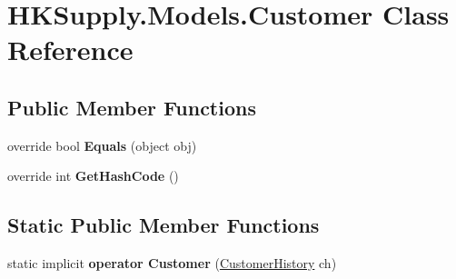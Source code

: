 \hypertarget{class_h_k_supply_1_1_models_1_1_customer}{}\section{H\+K\+Supply.\+Models.\+Customer Class Reference}
\label{class_h_k_supply_1_1_models_1_1_customer}
\subsection*{Public Member Functions}
\begin{DoxyCompactItemize}
\item 
\mbox{\label{class_h_k_supply_1_1_models_1_1_customer_a7e21d342fe37d5133dbaff9c32f35d05}} 
override bool {\bfseries Equals} (object obj)
\item 
\mbox{\label{class_h_k_supply_1_1_models_1_1_customer_a1277096021a0d574871c50508c576f85}} 
override int {\bfseries Get\+Hash\+Code} ()
\end{DoxyCompactItemize}
\subsection*{Static Public Member Functions}
\begin{DoxyCompactItemize}
\item 
\mbox{\label{class_h_k_supply_1_1_models_1_1_customer_ae2019ee85d1747457aedfaf889258e37}} 
static implicit {\bfseries operator Customer} (\mbox{\hyperlink{class_h_k_supply_1_1_models_1_1_customer_history}{Customer\+History}} ch)
\end{DoxyCompactItemize}
